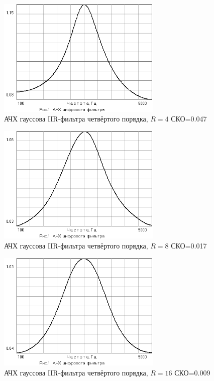 \begin{figure}[H]
  \centering
  \includegraphics[width=0.7\textwidth]{data/Z1_GAUSS/gain_IIR_4p_R4.png}
  \caption{АЧХ гауссова IIR-фильтра четвёртого порядка, $R=4$ СКО=0.047}
  \label{fig:}
\end{figure}
\begin{figure}[H]
  \centering
  \includegraphics[width=0.7\textwidth]{data/Z1_GAUSS/gain_IIR_4p_R8.png}
  \caption{АЧХ гауссова IIR-фильтра четвёртого порядка, $R=8$ СКО=0.017}
  \label{fig:}
\end{figure}
\begin{figure}[H]
  \centering
  \includegraphics[width=0.7\textwidth]{data/Z1_GAUSS/gain_IIR_4p_R16.png}
  \caption{АЧХ гауссова IIR-фильтра четвёртого порядка, $R=16$ СКО=0.009}
  \label{fig:}
\end{figure}

